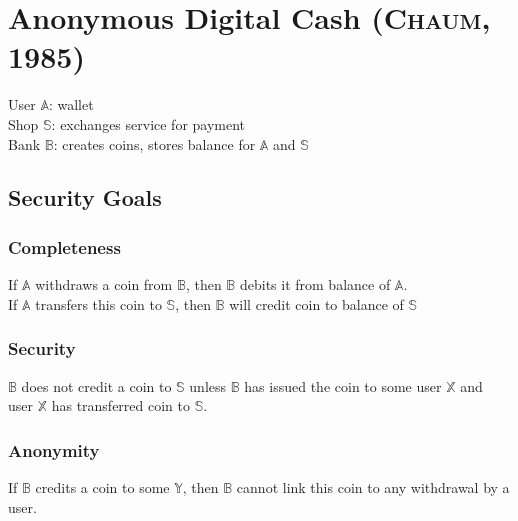 \documentclass{report}
\begin{document}
\section{Anonymous Digital Cash (\textsc{Chaum}, 1985)}
\begin{adjustwidth}{2em}{2em}
	User $\mathbb{A}$: wallet \\
	Shop $\mathbb{S}$: exchanges service for payment \\
	Bank $\mathbb{B}$: creates coins, stores balance for $\mathbb{A}$ and $\mathbb{S}$
	\subsection{Security Goals}
	\begin{adjustwidth}{2em}{}
		\subsubsection{Completeness}
		\begin{adjustwidth}{2em}{}
			If $\mathbb{A}$ withdraws a coin from $\mathbb{B}$, then $\mathbb{B}$ debits it from balance of $\mathbb{A}$. \\
			If $\mathbb{A}$ transfers this coin to $\mathbb{S}$, then $\mathbb{B}$ will credit coin to balance of $\mathbb{S}$
		\end{adjustwidth}
		\subsubsection{Security}
		\begin{adjustwidth}{2em}{}
			$\mathbb{B}$ does not credit a coin to $\mathbb{S}$ unless $\mathbb{B}$ has issued the coin to some user $\mathbb{X}$ and user $\mathbb{X}$ has transferred coin to $\mathbb{S}$.
		\end{adjustwidth}
		\subsubsection{Anonymity}
		\begin{adjustwidth}{2em}{}
			If $\mathbb{B}$ credits a coin to some $\mathbb{Y}$, then $\mathbb{B}$ cannot link this coin to any withdrawal by a user.
		\end{adjustwidth}
	\end{adjustwidth}

\end{adjustwidth}
\end{document}
